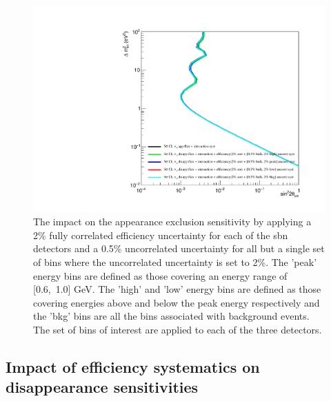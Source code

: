 \begin{figure}[h!]
    \centering
    \includegraphics[width = \largefigwidth]{figures-chap6/exclusion_contours/efficiency_systematics/nue_app_2pct_cor_05pct_bulk_2pct_X_uncor.pdf}
    \caption[\nue disapp with poorly constrained efficiency systematic for a set of bins.]{The impact on the \nue appearance exclusion sensitivity by applying a 2\% fully correlated efficiency uncertainty for each of the \gls{sbn} detectors and a 0.5\% uncorrelated uncertainty for all but a single set of bins where the uncorrelated uncertainty is set to 2\%. The 'peak' energy bins are defined as those covering an energy range of [0.6,~1.0] GeV. The 'high' and 'low' energy bins are defined as those covering energies above and below the peak energy respectively and the 'bkg' bins are all the bins associated with background events. The set of bins of interest are applied to each of the three detectors.}
    \label{fig:nue_app_bulk_uncertainty}
\end{figure}



\clearpage

\subsection{\texorpdfstring{Impact of efficiency systematics on \nue disappearance sensitivities}{Impact of efficiency systematics on nue disappearance sensitivities}}

